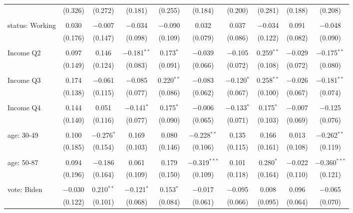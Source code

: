 \begin{tabular}{@{\extracolsep{5pt}}lccccccccc}
  & (0.326) & (0.272) & (0.181) & (0.255) & (0.184) & (0.200) & (0.281) & (0.188) & (0.208) \\ 
  & & & & & & & & & \\ 
 status: Working & 0.030 & $-$0.007 & $-$0.034 & $-$0.090 & 0.032 & 0.037 & $-$0.034 & 0.091 & $-$0.048 \\ 
  & (0.176) & (0.147) & (0.098) & (0.109) & (0.079) & (0.086) & (0.122) & (0.082) & (0.090) \\ 
  & & & & & & & & & \\ 
 Income Q2 & 0.097 & 0.146 & $-$0.181$^{**}$ & 0.173$^{*}$ & $-$0.039 & $-$0.105 & 0.259$^{**}$ & $-$0.029 & $-$0.175$^{**}$ \\ 
  & (0.149) & (0.124) & (0.083) & (0.091) & (0.066) & (0.072) & (0.108) & (0.072) & (0.080) \\ 
  & & & & & & & & & \\ 
 Income Q3 & 0.174 & $-$0.061 & $-$0.085 & 0.220$^{**}$ & $-$0.083 & $-$0.120$^{*}$ & 0.258$^{**}$ & $-$0.026 & $-$0.181$^{**}$ \\ 
  & (0.138) & (0.115) & (0.077) & (0.086) & (0.062) & (0.067) & (0.100) & (0.067) & (0.074) \\ 
  & & & & & & & & & \\ 
 Income Q4 & 0.144 & 0.051 & $-$0.141$^{*}$ & 0.175$^{*}$ & $-$0.006 & $-$0.133$^{*}$ & 0.175$^{*}$ & $-$0.007 & $-$0.125 \\ 
  & (0.140) & (0.116) & (0.077) & (0.090) & (0.065) & (0.071) & (0.103) & (0.069) & (0.076) \\ 
  & & & & & & & & & \\ 
 age: 30-49 & 0.100 & $-$0.276$^{*}$ & 0.169 & 0.080 & $-$0.228$^{**}$ & 0.135 & 0.166 & 0.013 & $-$0.262$^{**}$ \\ 
  & (0.185) & (0.154) & (0.103) & (0.146) & (0.106) & (0.115) & (0.161) & (0.108) & (0.119) \\ 
  & & & & & & & & & \\ 
 age: 50-87 & 0.094 & $-$0.186 & 0.061 & 0.179 & $-$0.319$^{***}$ & 0.101 & 0.280$^{*}$ & $-$0.022 & $-$0.360$^{***}$ \\ 
  & (0.196) & (0.164) & (0.109) & (0.150) & (0.109) & (0.118) & (0.164) & (0.110) & (0.121) \\ 
  & & & & & & & & & \\ 
 vote: Biden & $-$0.030 & 0.210$^{**}$ & $-$0.121$^{*}$ & 0.153$^{*}$ & $-$0.017 & $-$0.095 & 0.008 & 0.096 & $-$0.065 \\ 
  & (0.122) & (0.101) & (0.068) & (0.084) & (0.061) & (0.066) & (0.095) & (0.064) & (0.070) \\ 

\end{tabular}
